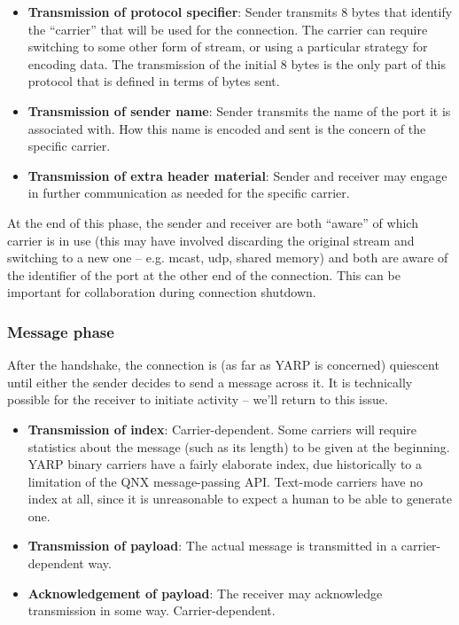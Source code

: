 \begin{itemize}

\item {\bf Transmission of protocol specifier}:
Sender transmits 8 bytes that identify the ``carrier'' that will be
used for the connection.  The carrier can require switching to 
some other form of stream, or using a particular strategy for
encoding data.  The transmission of the initial 8 bytes is the
only part of this protocol that is defined in terms of bytes sent.

\item {\bf Transmission of sender name}: Sender transmits the name of
the port it is associated with.  How this name is encoded and sent is
the concern of the specific carrier.

\item {\bf Transmission of extra header material}: Sender and
receiver may engage in further communication as needed for the
specific carrier.  

\end{itemize}

At the end of this phase, the sender and receiver are both ``aware''
of which carrier is in use (this may have involved discarding the
original stream and switching to a new one -- e.g. mcast, udp, shared
memory) and both are aware of the identifier of the port at the
other end of the connection.  This can be important for collaboration
during connection shutdown.


\subsubsection*{Message phase}

After the handshake, the connection is (as far as YARP is concerned)
quiescent until either the sender decides to send a message across it.
It is technically possible for the receiver to initiate activity --
we'll return to this issue.

\begin{itemize}

\item {\bf Transmission of index}: Carrier-dependent. Some carriers
will require statistics about the message (such as its length) to be
given at the beginning.  YARP binary carriers have a fairly elaborate
index, due historically to a limitation of the QNX message-passing
API.  Text-mode carriers have no index at all, since it is
unreasonable to expect a human to be able to generate one.

\item {\bf Transmission of payload}: The actual message is
transmitted in a carrier-dependent way.

\item {\bf Acknowledgement of payload}: The receiver may 
acknowledge transmission in some way.  Carrier-dependent.

\end{itemize}

